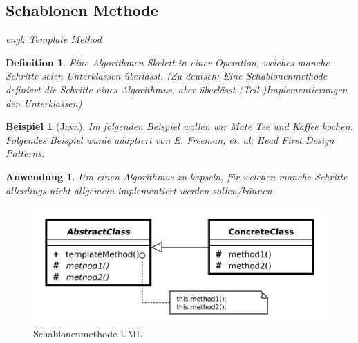 \documentclass[a4paper]{article}
\theoremstyle{break}
\newtheorem{defi}{Definition}[section]
\newtheorem{ex}{Beispiel}[section]
\newtheorem{why}{Anwendung}[section]
\begin{document}
\newpage
\subsection{Schablonen Methode}

\textit{engl. Template Method}

\begin{defi}
	Eine Algorithmen Skelett in einer Operation, welches manche Schritte seien Unterklassen überlässt. (Zu deutsch: Eine Schablonenmethode definiert die Schritte eines Algorithmus, aber überlässt (Teil-)Implementierungen den Unterklassen)
\end{defi}

\begin{ex}[Java]
	Im folgenden Beispiel wollen wir Mate Tee und Kaffee kochen. Folgendes Beispiel wurde adaptiert von E. Freeman, et. al; Head First Design Patterns.
	
	
	
	
	
	
\end{ex}

\begin{why}
		Um einen Algorithmus zu kapseln, für welchen manche Schritte allerdings nicht allgemein implementiert werden sollen/können.	
\end{why}
\begin{figure}[H]
	\centering
	\includegraphics[width=\textwidth]{../diagrams/uml/TemplateMethodPattern.png}
	\caption{Schablonenmethode UML}
\end{figure}
\end{document}
